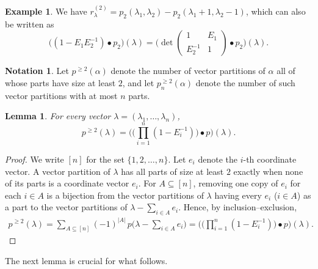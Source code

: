 \documentclass[reqno]{amsart}
\theoremstyle{plain}
\newtheorem{lemma}[theorem]{Lemma}
\theoremstyle{definition}
\newtheorem{notation}[theorem]{Notation}
\newtheorem{example}[theorem]{Example}
\theoremstyle{remark}
\theoremstyle{plain}
\begin{document}
\begin{example}
We have $r_\lambda^{(2)}=p_2(\lambda_1,\lambda_2)-p_2(\lambda_1+1,\lambda_2-1)$,
which can also be written as
\begin{equation*}
    \big((1-E_1E_2^{-1})\bullet p_2\big)(\lambda)=\Bigg(\det\begin{pmatrix}
        1&E_1\\E_2^{-1}&1
    \end{pmatrix}\bullet p_2\Bigg) (\lambda).
\end{equation*}
\end{example}

\begin{notation}\label{notation-p-geq-2}
Let $p^{\geq 2}(\alpha)$ denote the number of vector partitions of $\alpha$
all of whose parts have size at least $2$, and let $p_n^{\geq 2}(\alpha)$
denote the number of such vector partitions with at most $n$ parts.
\end{notation}

\begin{lemma}\label{partition-without-e-i}
For every vector $\lambda=(\lambda_1,\dots,\lambda_n)$,
$$p^{\geq 2}(\lambda)=\bigg(\Big(\prod_{i=1}^n(1-E_i^{-1})\Big)\bullet p\bigg)(\lambda).$$
\end{lemma}
\begin{proof} We write $[n]$ for the set $\{1,2,\dots,n\}$.
Let $e_i$ denote the $i$-th coordinate vector. A vector partition of $\lambda$
has all parts of size at least $2$ exactly when none of its parts is a
coordinate vector $e_i$. For $A\subseteq[n]$, removing one copy of $e_i$ for
each $i\in A$ is a bijection from the vector partitions of $\lambda$ having
every $e_i$ ($i\in A$) as a part to the vector partitions of
$\lambda-\sum_{i\in A}e_i$. Hence, by inclusion--exclusion,
\begin{align*}
    p^{\geq 2}(\lambda)=\sum_{A\subseteq[n]}(-1)^{|A|}\,p\Big(\lambda-\sum_{i\in A}e_i\Big)
    =\bigg(\Big(\prod_{i=1}^n(1-E_i^{-1})\Big)\bullet p\bigg)(\lambda).
\end{align*}
\end{proof}

The next lemma is crucial for what follows.
\end{document}
